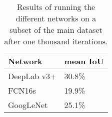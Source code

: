 \begin{table}[b]
	\centering
	\begin{tabular}{@{}ll@{}}
		\toprule
		Network     & mean IoU \\ \midrule
		DeepLab v3+ & 30.8\%   \\
		FCN16s      & 19.9\%   \\
		GoogLeNet   & 25.1\%   \\ \bottomrule
	\end{tabular}
	\caption[Network Comparison Results]{Results of running the different networks on a subset of the main dataset after one thousand iterations.}
	\label{tab:network-comparison}
\end{table}